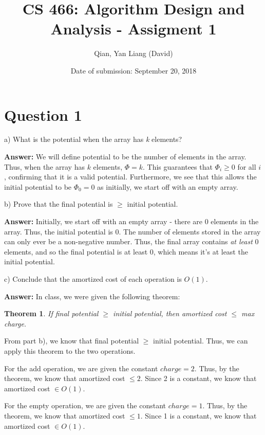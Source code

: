 \documentclass{article}
\title{CS 466: Algorithm Design and Analysis - Assigment 1}
\author{Qian, Yan Liang (David)}
\date{Date of submission: September 20, 2018}
\newtheorem{theorem}{Theorem}
\begin{document}
\newpage

\section{Question 1}

a) What is the potential when the array has \textit{k} elements?
\newline

\textbf{Answer:} We will define potential to be the number of elements in the array.
Thus, when the array has $k$ elements, $\Phi = k$.
This guarantees that $\Phi_i \geq 0$ for all $i$, confirming that it is a valid potential.
Furthermore, we see that this allows the initial potential to be $\Phi_0 = 0$ as initially, we start off with
an empty array.
\newline

b) Prove that the final potential is $\geq$ initial potential.
\newline

\textbf{Answer:} Initially, we start off with an empty array - there are 0 elements in the array. Thus, the initial
potential is 0.
The number of elements stored in the array can only ever be a non-negative number. Thus, the final array contains
\textit{at least} 0 elements, and so the final potential is at least 0, which means it's at least the initial potential.
\newline

c) Conclude that the amortized cost of each operation is $O(1)$.
\newline

\textbf{Answer:} In class, we were given the following theorem:

\begin{theorem}
    If final potential $\geq$ initial potential, then amortized cost $\leq$ max charge.
\end{theorem}

From part b), we know that final potential $\geq$ initial potential. Thus, we can apply this theorem to the two
operations.

For the add operation, we are given the constant $charge = 2$. Thus, by the theorem, we know that amortized cost $\leq
2$. Since 2 is a constant, we know that amortized cost $\in O(1)$.

For the empty operation, we are given the constant $charge = 1$. Thus, by the theorem, we know that amortized cost $\leq
1$. Since 1 is a constant, we know that amortized cost $\in O(1)$.
\newline
\end{document}
